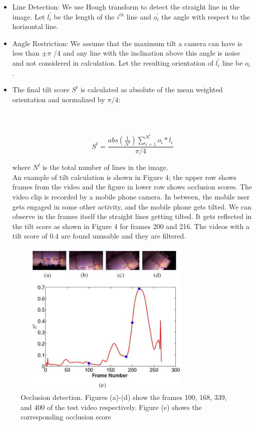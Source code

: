 \documentclass{sig-alternate}
\begin{document}
\begin{itemize}
    \item  Line Detection: We use Hough transform to detect the straight
line in the image. Let $l^'_i$ be the length of the $i^{th}$ line and $o_i^'$ the angle with respect to the horizontal line.



\item  Angle Restriction: We assume that the maximum tilt a camera can have is less than $±\pi$ /4 and any line with the inclination above this angle is noise and not considered in calculation. Let the resulting orientation of $l^'_i$ line be $o_i$ . 


\item  The final tilt score $S^t$ is calculated as absolute of the mean
weighted orientation and normalized by $\pi/4$:\\\\\\\\

$$S^t=\frac{ abs(\frac{1}{N^l}) \sum_{i=1}^{N^l} o_i*l_i}{\pi/4}$$

where $N^l$ is the total number of lines in the image.\\

An example of tilt calculation is shown in Figure 4; the upper
row shows frames from the video and the figure in lower row shows
occlusion scores. The video clip is recorded by a mobile phone
camera. In between, the mobile user gets engaged in some other
activity, and the mobile phone gets tilted. We can observe in the
frames itself the straight lines getting tilted. It gets reflected in the
tilt score as shown in Figure 4 for frames 200 and 216. The videos
with a tilt score of 0.4 are found unusable and they are filtered.


\end{itemize}

\begin{figure}[h!]
  
  \includegraphics[width=9cm, height=7.5cm]{video_2.pdf}
\caption{ Occlusion detection. Figures (a)-(d) show the frames
100, 168, 339, and 400 of the test video respectively. Figure (e)
shows the corresponding occlusion score}
\end{figure}
\end{document}
